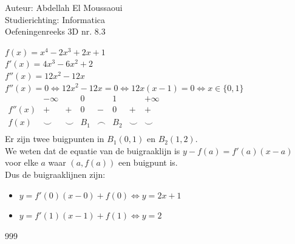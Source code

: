 \documentclass[a4paper]{article}
\begin{document}
  
\noindent \large Auteur: Abdellah El Moussaoui \\
\noindent \large Studierichting: Informatica\\
\noindent \large Oefeningenreeks 3D nr. 8.3\\

\medskip

\normalsize

$f(x)=x^4-2x^3+2x+1$\\

$f'(x)=4x^3-6x^2+2$\\

$f''(x)=12x^2-12x$\\

$f''(x)=0 \Leftrightarrow 12x^2-12x = 0 \Leftrightarrow 12x\left(x-1\right)=0 \Leftrightarrow x\in\{0,1\}$\\

$\begin{array}{r|ccccccc}
           & -\infty &        & 0   &        & 1   &        & +\infty \\
    \hline  
    f''(x) &    +    & +      & 0   & -      & 0   & +      &   +      \\
    f(x)   &     \smile    & \smile & B_1 & \frown & B_2 & \smile &    \smile     \\
\end{array}$ \\

Er zijn twee buigpunten in $B_1(0,1)$ en $B_2(1,2)$.\\

We weten dat de equatie van de buigraaklijn is $y-f(a)=f'(a)(x-a)$ voor elke $a$ waar $\left(a,f(a)\right)$ een buigpunt is.\\

Dus de buigraaklijnen zijn:\\
\begin{itemize}
    \item $y=f'(0)(x-0)+f(0) \Leftrightarrow \boxed{y=2x+1}$\\
    \item $y=f'(1)(x-1)+f(1) \Leftrightarrow \boxed{y=2}$\\
\end{itemize}

\begin{thebibliography}{999}
\end{thebibliography}
\end{document}
